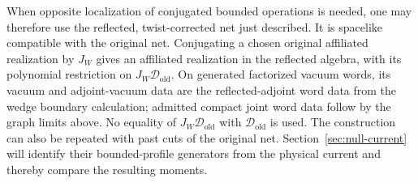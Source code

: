 When opposite localization of conjugated bounded operations is needed,
one may therefore use the reflected, twist-corrected net just described.
It is spacelike compatible with the original net. Conjugating a chosen
original affiliated realization by $J_W$ gives an affiliated realization
in the reflected algebra, with its polynomial restriction on
$J_W\mathcal D_{\mathrm{old}}$. On generated factorized vacuum words,
its vacuum and adjoint-vacuum data are the reflected-adjoint word data
from the wedge boundary calculation; admitted compact joint word data follow by the graph limits
above. No equality of $J_W\mathcal D_{\mathrm{old}}$ with
$\mathcal D_{\mathrm{old}}$ is used. The construction can also be repeated with past cuts
of the original net. Section~\ref{sec:null-current} will identify their
bounded-profile generators from the physical current and thereby compare
the resulting moments.
